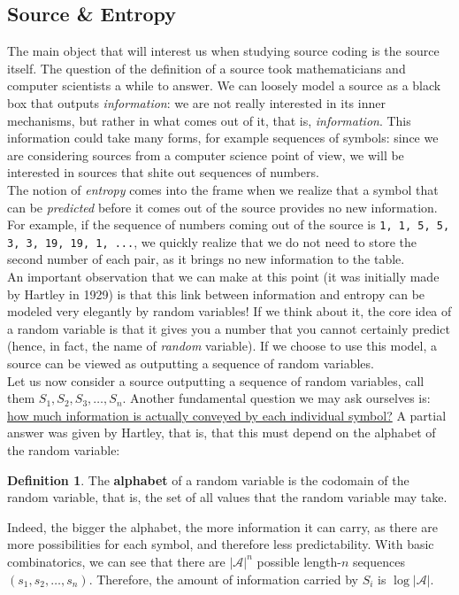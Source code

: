 \documentclass{article}
\theoremstyle{plain}
\theoremstyle{definition}
\newtheorem{defn}{Definition}
\theoremstyle{remark}
\begin{document}
\subsection{Source \& Entropy}
The main object that will interest us when studying source coding is the source itself. The question of the definition of a source took mathematicians and computer scientists a while to answer. We can loosely model a source as a black box that outputs \emph{information}: we are not really interested in its inner mechanisms, but rather in what comes out of it, that is, \emph{information}. This information could take many forms, for example sequences of symbols: since we are considering sources from a computer science point of view, we will be interested in sources that shite out sequences of numbers. \\
 The notion of \emph{entropy} comes into the frame when we realize that a symbol that can be \emph{predicted} before it comes out of the source provides no new information. For example, if the sequence of numbers coming out of the source is \texttt{1, 1, 5, 5, 3, 3, 19, 19, 1, ...}, we quickly realize that we do not need to store the second number of each pair, as it brings no new information to the table. \\
 An important observation that we can make at this point (it was initially made by Hartley in 1929) is that this link between information and entropy can be modeled very elegantly by random variables! If we think about it, the core idea of a random variable is that it gives you a number that you cannot certainly predict (hence, in fact, the name of \emph{random} variable). If we choose to use this model, a source can be viewed as outputting a sequence of random variables. \\
Let us now consider a source outputting a sequence of random variables, call them $S_1, S_2, S_3, \dots, S_n$. Another fundamental question we may ask ourselves is: \ul{how much information is actually conveyed by each individual symbol?} A partial answer was given by Hartley, that is, that this must depend on the alphabet of the random variable: 
\begin{defn}
	The \textbf{alphabet} of a random variable is the codomain of the random variable, that is, the set of all values that the random variable may take.
\end{defn}
Indeed, the bigger the alphabet, the more information it can carry, as there are more possibilities for each symbol, and therefore less predictability. With basic combinatorics, we can see that there are $|\mathcal A|^n$ possible length-$n$ sequences $(s_1, s_2, \dots, s_n)$. Therefore, the amount of information carried by $S_i$ is $\log|\mathcal A|$. 
\end{document}
